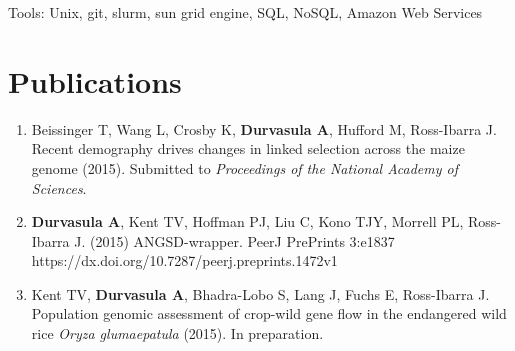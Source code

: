 \documentclass[letterpaper]{article}
\renewenvironment{itemize}{
  \begin{list}{}{
    \setlength{\leftmargin}{1em}
  }
}{
  \end{list}
}
\begin{document}
\begin{itemize}
\item Tools: Unix, git, slurm, sun grid engine, SQL, NoSQL, Amazon Web Services
\end{itemize}


\setlength\parskip{0.15em}

\section*{Publications}
\begin{enumerate}[leftmargin=!,labelindent=5pt,itemindent=-15pt]
\item Beissinger T, Wang L, Crosby K, {\bf Durvasula A}, Hufford M, Ross-Ibarra J. Recent demography drives changes in linked selection across the maize genome (2015). Submitted to {\it Proceedings of the National Academy of Sciences}.
\item {\bf Durvasula A}, Kent TV, Hoffman PJ, Liu C, Kono TJY, Morrell PL, Ross-Ibarra J. (2015) ANGSD-wrapper. PeerJ PrePrints 3:e1837 https://dx.doi.org/10.7287/peerj.preprints.1472v1
\item Kent TV, {\bf Durvasula A}, Bhadra-Lobo S, Lang J, Fuchs E, Ross-Ibarra J. Population genomic assessment of crop-wild gene flow in the endangered wild rice \emph{Oryza glumaepatula} (2015). In preparation.
\end{enumerate}
\end{document}
